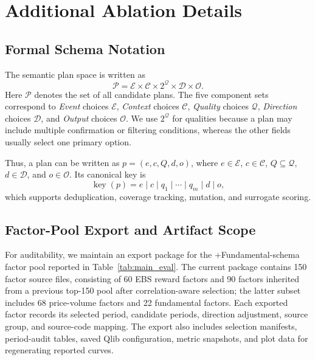 \section{Additional Ablation Details}
\label{sec:appendix_ablation}

\subsection{Formal Schema Notation}
\label{sec:appendix_schema_notation}

The semantic plan space is written as
\[
  \mathcal{P} = \mathcal{E} \times \mathcal{C} \times 2^{\mathcal{Q}}
                \times \mathcal{D} \times \mathcal{O}.
\]
Here \(\mathcal{P}\) denotes the set of all candidate plans. The five component
sets correspond to \emph{Event} choices \(\mathcal{E}\), \emph{Context} choices
\(\mathcal{C}\), \emph{Quality} choices \(\mathcal{Q}\), \emph{Direction}
choices \(\mathcal{D}\), and \emph{Output} choices \(\mathcal{O}\). We use
\(2^{\mathcal{Q}}\) for qualities because a plan may include multiple
confirmation or filtering conditions, whereas the other fields usually select
one primary option.

Thus, a plan can be written as \(p=(e,c,Q,d,o)\), where \(e\in\mathcal{E}\),
\(c\in\mathcal{C}\), \(Q\subseteq\mathcal{Q}\), \(d\in\mathcal{D}\), and
\(o\in\mathcal{O}\). Its canonical key is
\[
  \operatorname{key}(p)=e\mid c\mid q_1\mid\cdots\mid q_m\mid d\mid o,
\]
which supports deduplication, coverage tracking, mutation, and surrogate
scoring.



\subsection{Factor-Pool Export and Artifact Scope}

For auditability, we maintain an export package for the +Fundamental-schema \method{} factor pool reported in Table~\ref{tab:main_eval}. The current package contains 150 factor source files, consisting of 60 EBS reward factors and 90 factors inherited from a previous top-150 pool after correlation-aware selection; the latter subset includes 68 price-volume factors and 22 fundamental factors. Each exported factor records its selected period, candidate periods, direction adjustment, source group, and source-code mapping. The export also includes selection manifests, period-audit tables, saved Qlib configuration, metric snapshots, and plot data for regenerating reported curves.


